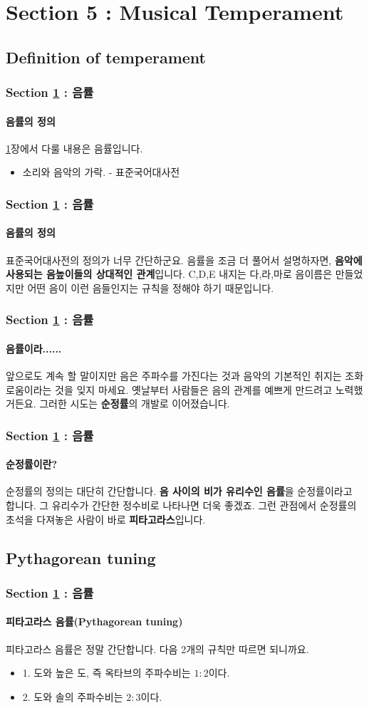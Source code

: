 \documentclass{beamer}
\begin{document}
	
	\section{Section 5 : Musical Temperament}\label{sec:temperament}
	\subsection{Definition of temperament}
	\begin{frame}
		\frametitle{Section \ref{sec:temperament} : 음률}
		\framesubtitle{음률의 정의}
		\ref{sec:temperament}장에서 다룰 내용은 음률입니다.
		\begin{definition}[음률, 音律, Temperament]
			\begin{itemize}
				\item 소리와 음악의 가락. - 표준국어대사전
			\end{itemize}
		\end{definition}
	\end{frame}
	
	\begin{frame}
		\frametitle{Section \ref{sec:temperament} : 음률}
		\framesubtitle{음률의 정의}
		표준국어대사전의 정의가 너무 간단하군요. 음률을 조금 더 풀어서 설명하자면, {\bf 음악에 사용되는 음높이들의 상대적인 관계}입니다. C,D,E 내지는 다,라,마로 음이름은 만들었지만 어떤 음이 이런 음들인지는 규칙을 정해야 하기 때문입니다.
	\end{frame}
	
	\begin{frame}
		\frametitle{Section \ref{sec:temperament} : 음률}
		\framesubtitle{음률이라......}
		앞으로도 계속 할 말이지만 음은 주파수를 가진다는 것과 음악의 기본적인 취지는 조화로움이라는 것을 잊지 마세요. 옛날부터 사람들은 음의 관계를 예쁘게 만드려고 노력했거든요. 그러한 시도는 {\bf 순정률}의 개발로 이어졌습니다.
	\end{frame}
	
	\begin{frame}
		\frametitle{Section \ref{sec:temperament} : 음률}
		\framesubtitle{순정률이란?}
		순정률의 정의는 대단히 간단합니다. {\bf 음 사이의 비가 유리수인 음률}을 순정률이라고 합니다. 그 유리수가 간단한 정수비로 나타나면 더욱 좋겠죠. 그런 관점에서 순정률의 초석을 다져놓은 사람이 바로 {\bf 피타고라스}입니다.
	\end{frame}
	
	\subsection{Pythagorean tuning}
	\begin{frame}
		\frametitle{Section \ref{sec:temperament} : 음률}
		\framesubtitle{피타고라스 음률(Pythagorean tuning)}
		피타고라스 음률은 정말 간단합니다. 다음 2개의 규칙만 따르면 되니까요.
		\begin{itemize}
			\item 1. 도와 높은 도, 즉 옥타브의 주파수비는 $ 1:2 $이다. 
			\item 2. 도와 솔의 주파수비는 $ 2:3 $이다.
		\end{itemize}
	\end{frame}
	
\end{document}
